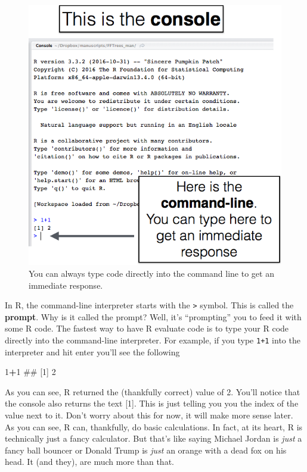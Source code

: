 \documentclass[]{book}
\newenvironment{Shaded}{\begin{snugshade}}{\end{snugshade}}
\newcommand{\DecValTok}[1]{\textcolor[rgb]{0.00,0.00,0.81}{#1}}
\newcommand{\OperatorTok}[1]{\textcolor[rgb]{0.81,0.36,0.00}{\textbf{#1}}}
\newcommand{\NormalTok}[1]{#1}
\theoremstyle{definition}
\theoremstyle{definition}
\theoremstyle{remark}
\begin{document}
\begin{figure}

{\centering \includegraphics[width=0.75\linewidth]{images/commandline} 

}

\caption{You can always type code directly into the command line to get an immediate response.}\label{fig:unnamed-chunk-53}
\end{figure}

In R, the command-line interpreter starts with the
\texttt{\textgreater{}} symbol. This is called the \textbf{prompt}. Why
is it called the prompt? Well, it's ``prompting'' you to feed it with
some R code. The fastest way to have R evaluate code is to type your R
code directly into the command-line interpreter. For example, if you
type \texttt{1+1} into the interpreter and hit enter you'll see the
following

\begin{Shaded}
\begin{Highlighting}[]
\DecValTok{1}\OperatorTok{+}\DecValTok{1}
\NormalTok{## [1] 2}
\end{Highlighting}
\end{Shaded}

As you can see, R returned the (thankfully correct) value of 2. You'll
notice that the console also returns the text {[}1{]}. This is just
telling you you the index of the value next to it. Don't worry about
this for now, it will make more sense later. As you can see, R can,
thankfully, do basic calculations. In fact, at its heart, R is
technically just a fancy calculator. But that's like saying Michael
Jordan is \emph{just} a fancy ball bouncer or Donald Trump is
\emph{just} an orange with a dead fox on his head. It (and they), are
much more than that.
\end{document}
